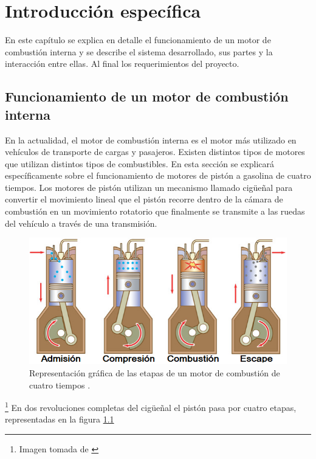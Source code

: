 \chapter{Introducción específica} %

\label{Chapter2}

En este capítulo se explica en detalle el funcionamiento de un motor de combustión interna y se describe el sistema desarrollado, sus partes y la interacción entre ellas. Al final los requerimientos del proyecto.

\section{Funcionamiento de un motor de combustión interna} \label{func-motor}

En la actualidad, el motor de combustión interna es el motor más utilizado en vehículos de transporte de cargas y pasajeros. Existen distintos tipos de motores que utilizan distintos tipos de combustibles. En esta sección se explicará específicamente sobre el funcionamiento de motores de pistón a gasolina de cuatro tiempos. Los motores de pistón utilizan un mecanismo llamado cigüeñal para convertir el movimiento lineal que el pistón recorre dentro de la cámara de combustión en un movimiento rotatorio que finalmente se transmite a las ruedas del vehículo a través de una transmisión.
\vfill
\begin{figure}[htpb]
\centering
\includegraphics[width=.9\textwidth]{./Figures/motor-combustion.png}
\caption{Representación gráfica de las etapas de un motor de combustión de cuatro tiempos \protect\footnotemark.}
\label{fig:motor-combustion}
\end{figure}
\footnote{Imagen tomada de \cite{motor}}
En dos revoluciones completas del cigüeñal el pistón pasa por cuatro etapas, representadas en la figura \ref{fig:motor-combustion}
